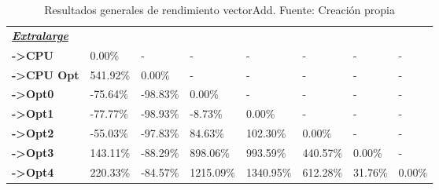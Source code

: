 \begin{table}[H]
\begin{tabular}{llllllll}
    \cellcolor[HTML]{DAE8FC} \textbf{\textbf{{\emph{{\underline{{Extralarge}}}}}}} &  &  &  &  &  &  &  \\
    \rowcolor[HTML]{EFEFEF} \cellcolor[HTML]{DAE8FC} \textbf{->CPU} & 0.00\% & - & - & - & - & - & - \\
    \cellcolor[HTML]{DAE8FC} \textbf{->CPU Opt} & 541.92\% & 0.00\% & - & - & - & - & - \\
    \rowcolor[HTML]{EFEFEF} \cellcolor[HTML]{DAE8FC} \textbf{->Opt0} & -75.64\% & -98.83\% & 0.00\% & - & - & - & - \\
    \cellcolor[HTML]{DAE8FC} \textbf{->Opt1} & -77.77\% & -98.93\% & -8.73\% & 0.00\% & - & - & - \\
    \rowcolor[HTML]{EFEFEF} \cellcolor[HTML]{DAE8FC} \textbf{->Opt2} & -55.03\% & -97.83\% & 84.63\% & 102.30\% & 0.00\% & - & - \\
    \cellcolor[HTML]{DAE8FC} \textbf{->Opt3} & 143.11\% & -88.29\% & 898.06\% & 993.59\% & 440.57\% & 	0.00\% & - \\
    \rowcolor[HTML]{EFEFEF} \cellcolor[HTML]{DAE8FC} \textbf{->Opt4} & 220.33\% & -84.57\% & 1215.09\% & 1340.95\% & 612.28\% & 	31.76\% & 	0.00\% \\
    \end{tabular}
    \caption[Resultados generales de rendimiento vectorAdd]{{Resultados generales de rendimiento vectorAdd. Fuente: Creación propia}}
    \label{table_global_vectorAdd_PerformanceResults_speedup}
\end{table}